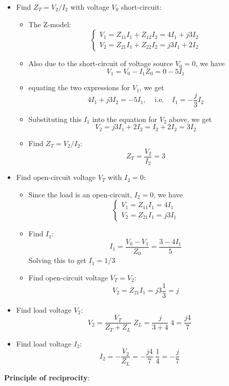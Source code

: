 \begin{itemize}
\begin{itemize}
\item Find $Z_T=V_2/I_2$ with voltage $V_0$ short-circuit:
  \begin{itemize}
  \item The Z-model:
    \[ \left\{ \begin{array}{l} V_1=Z_{11}I_1+Z_{12}I_2=4I_1+j3I_2	\\
      V_2=Z_{21}I_1+Z_{22}I_2=j3I_1+2I_2 \end{array} \right. \]
  \item Also due to the short-circuit of voltage source $V_0=0$, we have
    \[ V_1=V_0-I_1 Z_0=0-5I_1	\]
  \item equating the two expressions for $V_1$, we get
    \[ 4I_1+j3I_2=-5I_1,\;\;\;\;\mbox{i.e.}\;\;\;\;I_1=-\frac{j}{3} I_2	\]
  \item Substituting this $I_1$ into the equation for $V_2$ above, we get
    \[ V_2=j3I_1+2I_2=I_2+2I_2=3I_2 \]
  \item Find $Z_T=V_2/I_2$:
    \[ Z_T=\frac{V_2}{I_2}=3	\]
  \end{itemize}
\item Find open-circuit voltage $V_T$ with $I_2=0$:
  \begin{itemize}
  \item Since the load is an open-circuit, $I_2=0$, we have
    \[ \left\{ \begin{array}{l} V_1=Z_{11}I_1=4I_1 \\
      V_2=Z_{21}I_1=j3 I_1 \end{array} \right. \]
    \item Find $I_1$:
      \[	I_1=\frac{V_0-V_1}{Z_0}=\frac{3-4I_1}{5}	\]
      Solving this to get $I_1=1/3$
    \item Find open-circuit voltage $V_T=V_2$:
      \[	V_2=Z_{21}I_1=j3 \frac{1}{3}=j	\]
  \end{itemize}
\item Find load voltage $V_2$:
  \[ V_2=\frac{V_T}{Z_T+Z_L}\;Z_L=\frac{j}{3+4}\;4=\frac{j4}{7} \]
\item Find load voltage $I_2$:
  \[ I_2=-\frac{V_2}{Z_L}=-\frac{j4}{7}\;\frac{1}{4}=-\frac{j}{7} \]
\end{itemize}


{\bf Principle of reciprocity}:
 


\end{itemize}
